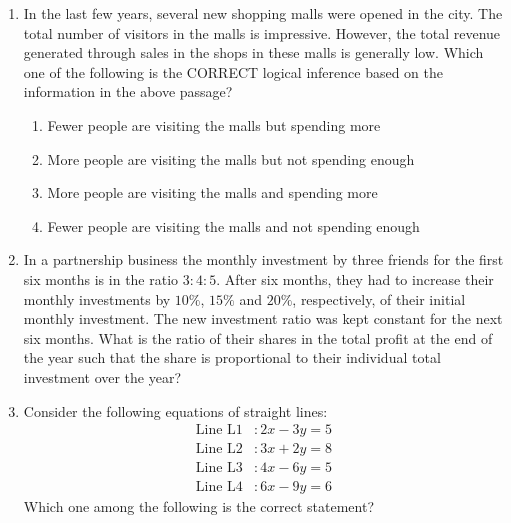 \documentclass[journal,12pt,onecolumn]{IEEEtran}
\theoremstyle{remark}
\begin{document}
\begin{enumerate}
    \item In the last few years, several new shopping malls were opened in the city. The total number of visitors in the malls is impressive. However, the total revenue generated through sales in the shops in these malls is generally low. Which one of the following is the CORRECT logical inference based on the information in the above passage?

    \hfill{}
    \begin{enumerate}
        \item Fewer people are visiting the malls but spending more
        \item More people are visiting the malls but not spending enough
        \item More people are visiting the malls and spending more
        \item Fewer people are visiting the malls and not spending enough
    \end{enumerate}

    \item In a partnership business the monthly investment by three friends for the first six months is in the ratio $3 \colon 4 \colon 5$. After six months, they had to increase their monthly investments by $10\%$, $15\%$ and $20\%$, respectively, of their initial monthly investment. The new investment ratio was kept constant for the next six months. What is the ratio of their shares in the total profit  at the end of the year such that the share is proportional to their individual total investment over the year?

    \hfill{}
    \begin{enumerate}
    \end{enumerate}

    \item Consider the following equations of straight lines:
    \begin{align*}
        \text{Line L1} &\colon 2x - 3y = 5 \\
        \text{Line L2} &\colon 3x + 2y = 8 \\
        \text{Line L3} &\colon 4x - 6y = 5 \\
        \text{Line L4} &\colon 6x - 9y = 6
    \end{align*}
    Which one among the following is the correct statement?


\end{enumerate}
\end{document}
